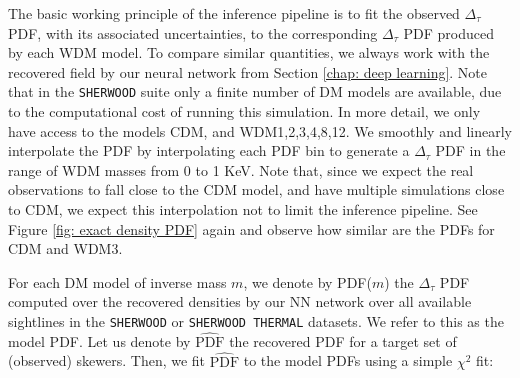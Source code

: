 The basic working principle of the inference pipeline is to fit the observed $\Delta_\tau$ PDF, with its associated uncertainties, to the corresponding $\Delta_\tau$ PDF produced by each WDM model. To compare similar quantities, we always work with the recovered field by our neural network from Section \ref{chap: deep learning}. Note that in the \texttt{SHERWOOD} suite only a finite number of DM models are available, due to the computational cost of running this simulation. In more detail, we only have access to the models CDM, and WDM1,2,3,4,8,12. We smoothly and linearly interpolate the PDF by interpolating each PDF bin to generate a $\Delta_\tau$ PDF in the range of WDM masses from 0 to 1 KeV. Note that, since we expect the real observations to fall close to the CDM model, and have multiple simulations close to CDM, we expect this interpolation not to limit the inference pipeline. See Figure \ref{fig: exact density PDF} again and observe how similar are the PDFs for CDM and WDM3.

For each DM model of inverse mass $m$, we denote by PDF($m$)  the $\Delta_\tau$ PDF computed over the recovered densities by our NN network over all available sightlines in the \texttt{SHERWOOD} or \texttt{SHERWOOD THERMAL} datasets. We refer to this as the model PDF. Let us denote by $\widehat{\text{PDF}}$ the recovered PDF for a target set of (observed) skewers. Then, we fit $\widehat{\text{PDF}}$ to the model PDFs using a simple $\chi^2$ fit:

